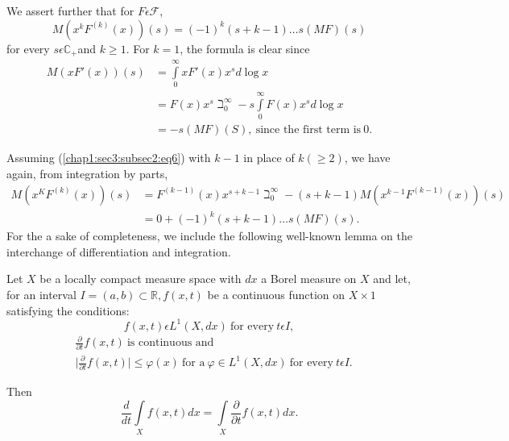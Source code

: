 We assert further that for $F\epsilon\mathscr{F}$, 
\begin{equation*}
  M(x^{k}F^{(k)}(x))(s)=(-1)^{k}(s+k-1)\ldots
  s(MF)(s)\tag{6}\label{chap1:sec3:subsec2:eq6} 
\end{equation*}
for every $s\epsilon\mathbb{C}_{+}$and $k\ge1$. For $k=1$, the formula
is clear since  
\begin{align*}
  M(xF'(x))(s) & =\int\limits_{0}^{\infty}xF'(x)x^sd\log x\\
  &
  =F(x)x^{s}{\displaystyle{\mathop{\beth}_{0}^{\infty}}} - s
  \int\limits_{0}^{\infty}F(x)x^{s}d \log x\\ 
  & =-s(MF)(S), ~\text{since the first term is}~ 0. 
\end{align*}

Assuming (\ref{chap1:sec3:subsec2:eq6}) with $k-1$ in place of $k(\ge 2)$, we have again, from
integration by parts,  
\begin{align*}
  M(x^{K}F^{(k)}(x))(s)&
  =F^{(k-1)}(x)x^{s+k-1}{\displaystyle{\mathop{\beth}_{0}^{\infty}}} -
  {(s+k-1)}M(x^{k-1}F^{(k-1)}(x))(s)\\ 
  & =0+(-1)^{k}(s+k-1)\ldots s(MF)(s).
\end{align*}
For the a sake of completeness, we include the following well-known
lemma on the interchange of differentiation and integration.  

\setcounter{lemma}{1}
\begin{lemma} \label{chap1:sec3:subsec2:lem2}%
  Let $X$ be a locally compact measure space with $dx$ a Borel measure
  on $X$ and let, for an interval $I=(a,b)\subset\mathbb{R},f(x,t)$ be
  a continuous function on $X\times 1$ satisfying the conditions: 
  \begin{equation*}
    f(x,t)\epsilon L^{1}(X,dx) ~\text{for every}~ t\epsilon I,
  \end{equation*}
  \begin{align*}
    & \frac{\partial}{\partial t}f(x,t) ~\text{is continuous and}\\
    & \Big|\frac{\partial}{\partial t}f(x,t) \Big|\le \varphi(x)
    ~\text{for a}~ \varphi \in L^{1} (X,dx)
    ~\text {for every}~ t\epsilon I. 
  \end{align*}
\end{lemma}

Then\pageoriginale
\begin{equation*}
  \frac{d}{dt}\int\limits_{X}f(x,t) dx =
  \int\limits_{X}\frac{\partial}{\partial t} f(x,t) dx. 
\end{equation*}

